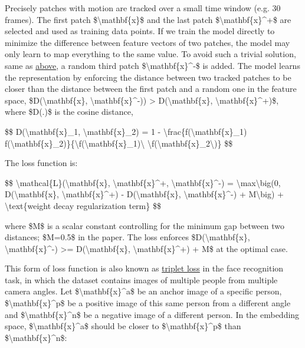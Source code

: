 Precisely patches with motion are tracked over a small time window (e.g. 30 frames). The first patch \$\textbackslash mathbf\{x\}\$ and the last patch \$\textbackslash mathbf\{x\}\^{}+\$ are selected and used as training data points. If we train the model directly to minimize the difference between feature vectors of two patches, the model may only learn to map everything to the same value. To avoid such a trivial solution, same as \hyperref[counting-feature-loss]{above}, a random third patch \$\textbackslash mathbf\{x\}\^{}-\$ is added. The model learns the representation by enforcing the distance between two tracked patches to be closer than the distance between the first patch and a random one in the feature space, \$D(\textbackslash mathbf\{x\}, \textbackslash mathbf\{x\}\^{}-)) \textgreater{} D(\textbackslash mathbf\{x\}, \textbackslash mathbf\{x\}\^{}+)\$, where \$D(.)\$ is the cosine distance,

\$\$ D(\textbackslash mathbf\{x\}\_1, \textbackslash mathbf\{x\}\_2) = 1 - \textbackslash frac\{f(\textbackslash mathbf\{x\}\_1) f(\textbackslash mathbf\{x\}\_2)\}\{\textbackslash\textbar f(\textbackslash mathbf\{x\}\_1)\textbackslash\textbar{} \textbackslash\textbar f(\textbackslash mathbf\{x\}\_2\textbackslash\textbar)\} \$\$

The loss function is:

\$\$ \textbackslash mathcal\{L\}(\textbackslash mathbf\{x\}, \textbackslash mathbf\{x\}\^{}+, \textbackslash mathbf\{x\}\^{}-) = \textbackslash max\textbackslash big(0, D(\textbackslash mathbf\{x\}, \textbackslash mathbf\{x\}\^{}+) - D(\textbackslash mathbf\{x\}, \textbackslash mathbf\{x\}\^{}-) + M\textbackslash big) + \textbackslash text\{weight decay regularization term\} \$\$

where \$M\$ is a scalar constant controlling for the minimum gap between two distances; \$M=0.5\$ in the paper. The loss enforces \$D(\textbackslash mathbf\{x\}, \textbackslash mathbf\{x\}\^{}-) \textgreater= D(\textbackslash mathbf\{x\}, \textbackslash mathbf\{x\}\^{}+) + M\$ at the optimal case.

\hyperref[triplet-loss]{}This form of loss function is also known as \href{https://arxiv.org/abs/1503.03832}{triplet loss} in the face recognition task, in which the dataset contains images of multiple people from multiple camera angles. Let \$\textbackslash mathbf\{x\}\^{}a\$ be an anchor image of a specific person, \$\textbackslash mathbf\{x\}\^{}p\$ be a positive image of this same person from a different angle and \$\textbackslash mathbf\{x\}\^{}n\$ be a negative image of a different person. In the embedding space, \$\textbackslash mathbf\{x\}\^{}a\$ should be closer to \$\textbackslash mathbf\{x\}\^{}p\$ than \$\textbackslash mathbf\{x\}\^{}n\$:

